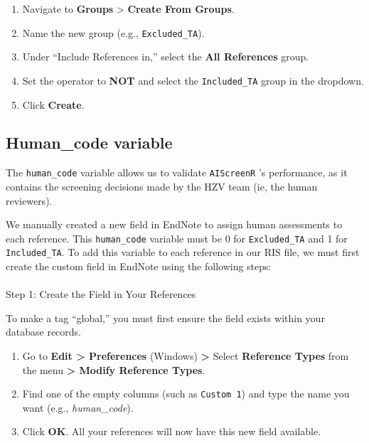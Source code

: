 \documentclass[
  letterpaper,
  DIV=11,
  numbers=noendperiod]{scrartcl}
\makeatletter
\let\oldparagraph\paragraph
\renewcommand{\paragraph}{
    \@ifstar
      \xxxParagraphStar
      \xxxParagraphNoStar
  }
\newcommand{\xxxParagraphStar}[1]{\oldparagraph*{#1}\mbox{}}
\newcommand{\xxxParagraphNoStar}[1]{\oldparagraph{#1}\mbox{}}
\makeatother
\begin{document}
\begin{enumerate}
\def\labelenumi{\arabic{enumi}.}
\item
  Navigate to \textbf{Groups} \textgreater{} \textbf{Create From
  Groups}.
\item
  Name the new group (e.g., \texttt{Excluded\_TA}).
\item
  Under ``Include References in,'' select the \textbf{All References}
  group.
\item
  Set the operator to \textbf{NOT} and select the \texttt{Included\_TA}
  group in the dropdown.
\item
  Click \textbf{Create}.
\end{enumerate}

\subsection{Human\_code variable}\label{human_code-variable}

The \texttt{human\_code} variable allows us to validate
\texttt{AIScreenR} 's performance, as it contains the screening
decisions made by the HZV team (ie, the human reviewers).

We manually created a new field in EndNote to assign human assessments
to each reference. This \texttt{human\_code} variable must be 0 for
\texttt{Excluded\_TA} and 1 for \texttt{Included\_TA}. To add this
variable to each reference in our RIS file, we must first create the
custom field in EndNote using the following steps:

\paragraph{Step 1: Create the Field in Your
References}\label{step-1-create-the-field-in-your-references}

To make a tag ``global,'' you must first ensure the field exists within
your database records.

\begin{enumerate}
\def\labelenumi{\arabic{enumi}.}
\item
  Go to \textbf{Edit \textgreater{} Preferences} (Windows)
  \textbf{\textgreater{}} Select \textbf{Reference Types} from the menu
  \textbf{\textgreater{} Modify Reference Types}.
\item
  Find one of the empty columns (such as \texttt{Custom\ 1}) and type
  the name you want (e.g., \emph{human\_code}).
\item
  Click \textbf{OK}. All your references will now have this new field
  available.
\end{enumerate}
\end{document}
